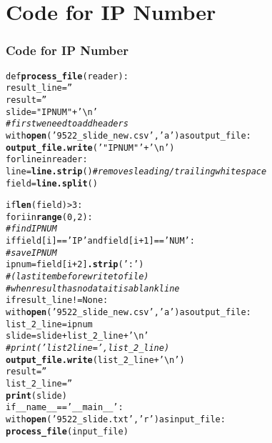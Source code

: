 \documentclass{beamer}\usepackage[]{graphicx}\usepackage[]{color}
\makeatletter
\newcommand{\hlstr}[1]{\textcolor[rgb]{0.192,0.494,0.8}{#1}}%
\newcommand{\hlcom}[1]{\textcolor[rgb]{0.678,0.584,0.686}{\textit{#1}}}%
\newcommand{\hlkwd}[1]{\textcolor[rgb]{0.737,0.353,0.396}{\textbf{#1}}}%
\newenvironment{kframe}{%
 \def\at@end@of@kframe{}%
 \ifinner\ifhmode%
  \def\at@end@of@kframe{\end{minipage}}%
  \begin{minipage}{\columnwidth}%
 \fi\fi%
 \def\FrameCommand##1{\hskip\@totalleftmargin \hskip-\fboxsep
 \colorbox{shadecolor}{##1}\hskip-\fboxsep
     \hskip-\linewidth \hskip-\@totalleftmargin \hskip\columnwidth}%
 \MakeFramed {\advance\hsize-\width
   \@totalleftmargin\z@ \linewidth\hsize
   \@setminipage}}%
 {\par\unskip\endMakeFramed%
 \at@end@of@kframe}
\newenvironment{knitrout}{}{} %
\makeatother
\begin{document}
\section{Code for IP Number}
\begin{frame}[fragile]
  \frametitle{Code for IP Number}
  
   
\begin{knitrout}
\color{fgcolor}\begin{kframe}
\begin{alltt}
def \hlkwd{process_file}(reader):
    result_line= \hlstr{''}
    result=\hlstr{''}
    slide=\hlstr{"IPNUM"} +\hlstr{'\textbackslash{}n'}
\hlcom{    #first we need to add headers}
    with \hlkwd{open}(\hlstr{'9522_slide_new.csv'}, \hlstr{'a'}) as output_file:
        \hlkwd{output_file.write}(\hlstr{'\hlstr{"IPNUM"}'} +\hlstr{'\textbackslash{}n'})
    for line in reader:
        line=\hlkwd{line.strip}()    \hlcom{#removes leading/trailing whitespace}
        field = \hlkwd{line.split}()

        if \hlkwd{len}(field)>3:
            for i in \hlkwd{range}(0,2):
\hlcom{                #find IPNUM}
                if field[i] == \hlstr{'IP'} and field[i+1] ==\hlstr{'NUM'}:
\hlcom{                    #save IPNUM}
                    ipnum=field[i+2]\hlkwd{.strip}(\hlstr{':'})
\hlcom{                        #(last item before write to file)}
\hlcom{                        #when result has no data it is a blank line}
                    if result_line != None:
                        with \hlkwd{open}(\hlstr{'9522_slide_new.csv'}, \hlstr{'a'}) as output_file:
                            list_2_line=ipnum
                            slide=slide+list_2_line+\hlstr{'\textbackslash{}n'}
\hlcom{                            #print('list 2 line=',list_2_line)}
                            \hlkwd{output_file.write}(list_2_line+\hlstr{'\textbackslash{}n'})
                            result=\hlstr{''}
                            list_2_line=\hlstr{''}
    \hlkwd{print}(slide)       
if __name__ == \hlstr{'__main__'}:
    with \hlkwd{open}(\hlstr{'9522_slide.txt'}, \hlstr{'r'}) as input_file:
        \hlkwd{process_file}(input_file)
\end{alltt}


{\ttfamily\noindent\bfseries{}}\end{kframe}
\end{knitrout}


   
   
   
\end{frame}
\end{document}
